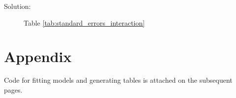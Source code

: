 \documentclass[11pt, letterpaper]{article}
\begin{document}
\begin{enumerate}[(a)]


\begin{description}
\item[Solution:] Table \ref{tab:standard_errors_interaction}
\end{description}

\end{enumerate}

\section*{Appendix}

Code for fitting models and generating tables is attached on the subsequent
pages.

\clearpage

\end{document}
